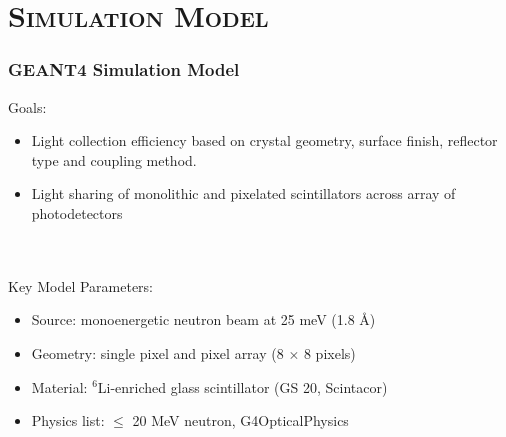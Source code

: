 \documentclass[xcolor=x11names, compress, handout]{beamer}
\renewcommand{\(}{\begin{columns}}
\renewcommand{\)}{\end{columns}}
\newcommand{\<}[1]{\begin{column}{#1}}
\renewcommand{\>}{\end{column}}
\begin{document}
\section{\scshape Simulation Model}
\begin{frame}
\frametitle{GEANT4 Simulation Model}
Goals:
\begin{itemize}
\item Light collection efficiency based on crystal geometry, surface finish, reflector type and coupling method.
\item Light sharing of monolithic and pixelated scintillators across array of photodetectors
\end{itemize}
\ \\
\ \\
Key Model Parameters:
\begin{itemize}
\item Source: monoenergetic neutron beam at 25 meV (1.8 \AA) 
\item Geometry: single pixel and pixel array (8 $\times$ 8 pixels)
\item Material: $^6$Li-enriched glass scintillator (GS 20, Scintacor)
\item Physics list: $\leq$ 20 MeV neutron, G4OpticalPhysics 
\end{itemize}
\end{frame}
\end{document}
